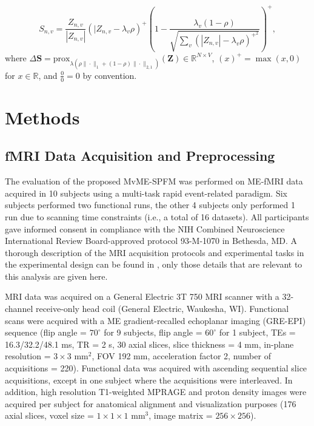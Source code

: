 \begin{equation}
    S_{n,v} = \frac{Z_{n,v}}{|Z_{n,v}|} \left( |Z_{n,v} - \lambda_v \rho \right)^+ \left( 1 - \frac{\lambda_v (1 - \rho)}{\sqrt{ \sum_v \left( |Z_{n,v}| - \lambda_v \rho \right)^{+^2} }} \right)^+,
    \label{eq:multivariate_multi-echo_proximal_operator}
\end{equation}
where $\Delta \mathbf{S} = \text{prox}_{\lambda \left(\rho \| \cdot \|_1 +
\left( 1 - \rho \right) \| \cdot \|_{2,1} \right)}\left(\mathbf{Z} \right) \in
\mathbb{R}^{N \times V}$, $\left( x \right)^+ = \max \left( x,0 \right)$ for $x
\in \mathbb{R}$, and $\frac{0}{0}=0$ by convention.

\section{Methods}
\label{sec:multivariate_methods}
\subsection{fMRI Data Acquisition and Preprocessing}

The evaluation of the proposed MvME-SPFM was performed on ME-fMRI data acquired
in 10 subjects using a multi-task rapid event-related paradigm. Six subjects
performed two functional runs, the other 4 subjects only performed 1 run due to
scanning time constraints (i.e., a total of 16 datasets). All participants gave
informed consent in compliance with the NIH Combined Neuroscience International
Review Board-approved protocol 93-M-1070 in Bethesda, MD. A thorough description
of the MRI acquisition protocols and experimental tasks in the experimental
design can be found in \citep{GonzalezCastillo2016Evaluationmultiecho}, only
those details that are relevant to this analysis are given here.

MRI data was acquired on a General Electric 3T 750 MRI scanner with a 32-channel
receive-only head coil (General Electric, Waukesha, WI). Functional scans were
acquired with a ME gradient-recalled echoplanar imaging (GRE-EPI) sequence (flip
angle = $70^\circ$ for 9 subjects, flip angle = $60^\circ$ for 1 subject, TEs =
16.3/32.2/48.1 ms, TR = 2 s, 30 axial slices, slice thickness = 4 mm, in-plane
resolution = $3\times3$ mm$^2$, FOV 192 mm, acceleration factor 2, number of
acquisitions = 220). Functional data was acquired with ascending sequential
slice acquisitions, except in one subject where the acquisitions were
interleaved. In addition, high resolution T1-weighted MPRAGE and proton density
images were acquired per subject for anatomical alignment and visualization
purposes (176 axial slices, voxel size = $1\times1\times1$ mm$^3$, image matrix
= $256\times256$).


